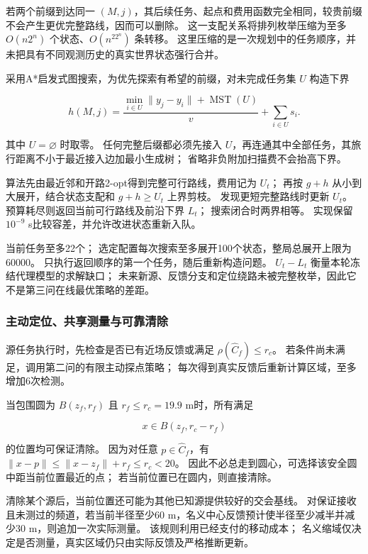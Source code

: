 \documentclass[UTF8,a4paper,zihao=5,fontset=fandol]{ctexart}
\begin{document}
若两个前缀到达同一 \((M,j)\)，其后续任务、起点和费用函数完全相同，较贵前缀不会产生更优完整路线，因而可以删除。
这一支配关系将排列枚举压缩为至多 \(O(n2^n)\) 个状态、\(O(n^22^n)\) 条转移。
这里压缩的是一次规划中的任务顺序，并未把具有不同观测历史的真实世界状态强行合并。

采用A*启发式图搜索\cite{hart1968}，为优先探索有希望的前缀，对未完成任务集 \(U\) 构造下界

\begin{equation}\label{eq:q3-10}
h(M,j)=\frac{\min_{i\in U}\|y_j-y_i\|+\operatorname{MST}(U)}{v}
+\sum_{i\in U}s_i.
\end{equation}

其中 \(U=\varnothing\) 时取零。
任何完整后缀都必须先接入 \(U\)，再连通其中全部任务，其旅行距离不小于最近接入边加最小生成树；
省略非负附加扫描费不会抬高下界。

算法先由最近邻和开路2-opt得到完整可行路线，费用记为 \(U_t\)；
再按 \(g+h\) 从小到大展开，结合状态支配和 \(g+h\ge U_t\) 上界剪枝。
发现更短完整路线时更新 \(U_t\)。
预算耗尽则返回当前可行路线及前沿下界 \(L_t\)；
搜索闭合时两界相等。
实现保留 \(10^{-9}\) s比较容差，并允许改进状态重新入队。

当前任务至多22个；
选定配置每次搜索至多展开100个状态，整局总展开上限为60000。
只执行返回顺序的第一个任务，随后重新构造问题。
\(U_t-L_t\) 衡量本轮冻结代理模型的求解缺口；
未来新源、反馈分支和定位绕路未被完整枚举，因此它不是第三问在线最优策略的差距。

\subsubsection{主动定位、共享测量与可靠清除}\label{sec:q3-4}

源任务执行时，先检查是否已有近场反馈或满足 \(\rho(\widehat C_f)\le r_c\)。
若条件尚未满足，调用第二问的有限主动探点策略；
每次得到真实反馈后重新计算区域，至多增加6次检测。

当包围圆为 \(B(z_f,r_f)\) 且 \(r_f\le r_c=19.9\) m时，所有满足

\begin{equation}\label{eq:q3-11}
x\in B(z_f,r_c-r_f)
\end{equation}

的位置均可保证清除。
因为对任意 \(p\in\widehat C_f\)，有 \(\|x-p\|\le\|x-z_f\|+r_f\le r_c<20\)。
因此不必总走到圆心，可选择该安全圆中距当前位置最近的点；
若当前位置已在圆内，则直接清除。

清除某个源后，当前位置还可能为其他已知源提供较好的交会基线。
对保证接收且未测过的频道，若当前半径至少60 m，名义中心反馈预计使半径至少减半并减少30 m，则追加一次实际测量。
该规则利用已经支付的移动成本；
名义缩域仅决定是否测量，真实区域仍只由实际反馈及严格推断更新。
\end{document}
